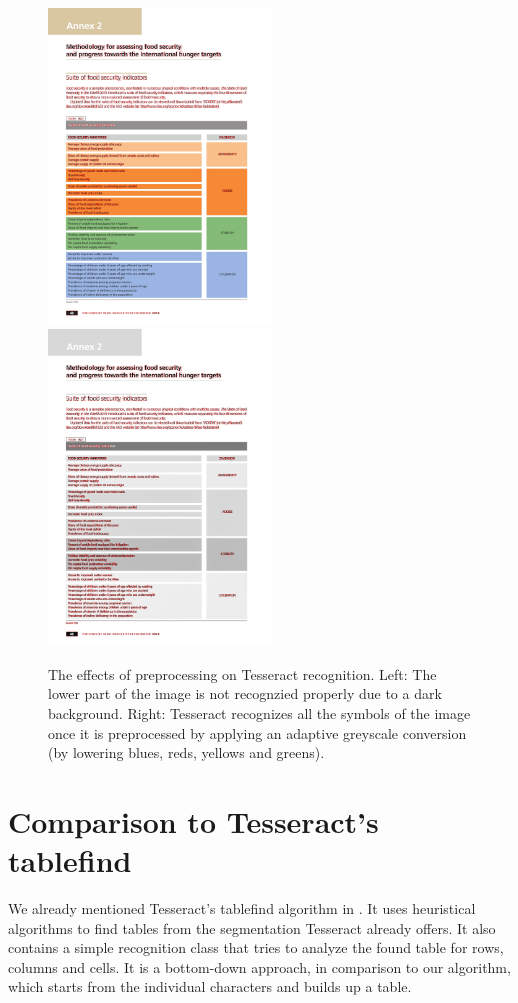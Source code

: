 \begin{figure}[t]
\centering

\includegraphics[width=16em]{img/results/im2_noPreproc.png}
\includegraphics[width=16em]{img/results/im2_Preproc.png}

\caption{The effects of preprocessing on Tesseract recognition. Left: The lower part of the image is not recognzied properly due to a dark background. Right: Tesseract recognizes all the symbols of the image once it is preprocessed by applying an adaptive greyscale conversion (by lowering blues, reds, yellows and greens).}
\label{fig:preprocessEffects}
\end{figure}

\section{Comparison to Tesseract's tablefind}

We already mentioned Tesseract's tablefind algorithm in . It uses heuristical algorithms to find tables from the segmentation Tesseract already offers. It also contains a simple recognition class that tries to analyze the found table for rows, columns and cells. It is a bottom-down approach, in comparison to our algorithm, which starts from the individual characters and builds up a table.

